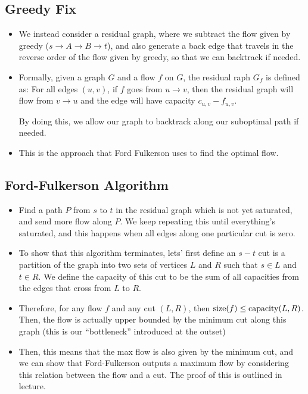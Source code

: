\subsection{Greedy Fix}
\begin{itemize}
	\item We instead consider a residual graph, where we subtract the flow given by greedy 
		($s \to A \to B \to t$), and also generate a back edge that travels in the reverse order of the flow 
		given by greedy, so that we can backtrack if needed. 
	\item Formally, given a graph $G$ and a flow $f$ on $G$, the residual raph $G_f$ is defined as:
		For all edges \((u, v)\), if $f$ goes from $u \to v$, then the residual graph will flow from $v \to u$ 
		and the edge will have capacity $c_{u, v} - f_{u, v}$. 

		By doing this, we allow our graph to backtrack along our suboptimal path if needed.  
	\item This is the approach that Ford Fulkerson uses to find the optimal flow.
\end{itemize}

\subsection{Ford-Fulkerson Algorithm}
\begin{itemize}
	\item Find a path $P$ from $s$ to $t$ in the residual graph which is not yet saturated, and send more 
		flow along $P$. We keep repeating this until everything's saturated, and this happens 
		when all edges along one particular cut is zero. 
	\item To show that this algorithm terminates, lets' first define an $s-t$ cut is a partition of the graph
		into two sets of vertices \(L\) and \( R\) such that 
		\(s \in L\) and \(t \in R\). We define the capacity of this cut to be the sum of all capacities from 
		the edges that cross from $L$ to $R$.  
	\item Therefore, for any flow $f$ and any cut \((L, R)\), then \(\mathrm{size}(f) \le \mathrm{capacity}(L, R)\). Then, the
		flow is actually upper bounded by the minimum cut along this graph (this is our ``bottleneck'' introduced
		at the outset)
	\item Then, this means that the max flow is also given by the minimum cut, and we can show that 
		Ford-Fulkerson outputs a maximum flow by considering this relation between the flow and a cut. The proof 
		of this is outlined in lecture. 

\end{itemize}


